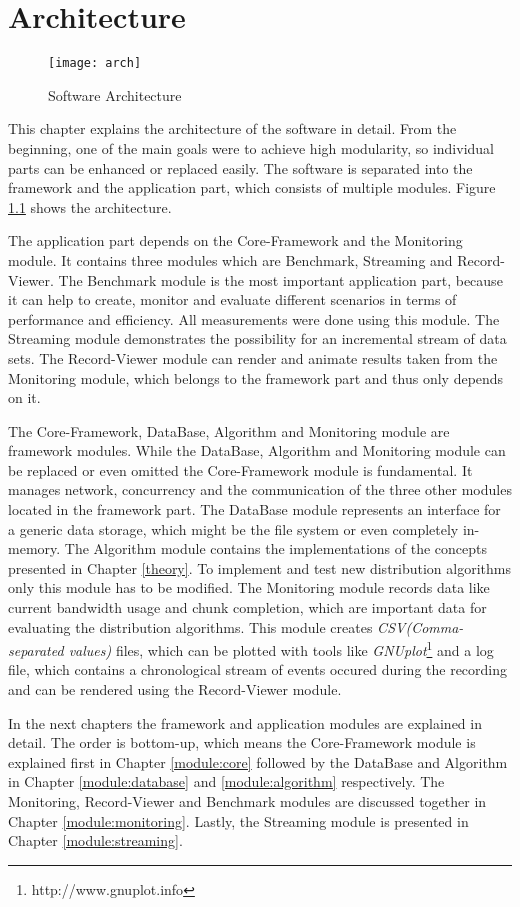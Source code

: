
\chapter{Architecture}
\label{architecture}

\begin{figure}[ht]
	\centering
	\texttt{[image: arch]}
	\caption{Software Architecture}
	\label{fig:arch}
\end{figure}

This chapter explains the architecture of the software in detail. From the beginning, one of the main goals were to achieve high modularity, so individual parts can be enhanced or replaced easily. The software is separated into the framework and the application part, which consists of multiple modules. Figure \ref{fig:arch} shows the architecture. 

\vfill
\pagebreak

The application part depends on the Core-Framework and the Monitoring module. It contains three modules which are Benchmark, Streaming and Record-Viewer. The Benchmark module is the most important application part, because it can help to create, monitor and evaluate different scenarios in terms of performance and efficiency. All measurements were done using this module. The Streaming module demonstrates the possibility for an incremental stream of data sets. The Record-Viewer module can render and animate results taken from the Monitoring module, which belongs to the framework part and thus only depends on it.

The Core-Framework, DataBase, Algorithm and Monitoring module are framework modules. While the DataBase, Algorithm and Monitoring module can be replaced or even omitted the Core-Framework module is fundamental. It manages network, concurrency and the communication of the three other modules located in the framework part. The DataBase module represents an interface for a generic data storage, which might be the file system or even completely in-memory. The Algorithm module contains the implementations of the concepts presented in Chapter \ref{theory}. To implement and test new distribution algorithms only this module has to be modified. The Monitoring module records data like current bandwidth usage and chunk completion, which are important data for evaluating the distribution algorithms. This module creates \emph{CSV(Comma-separated values)} files, which can be plotted with tools like \emph{GNUplot}\footnote{http://www.gnuplot.info} and a log file, which contains a chronological stream of events occured during the recording and can be rendered using the Record-Viewer module.

In the next chapters the framework and application modules are explained in detail. The order is bottom-up, which means the Core-Framework module is explained first in Chapter \ref{module:core} followed by the DataBase and Algorithm in Chapter \ref{module:database} and \ref{module:algorithm} respectively. The Monitoring, Record-Viewer and Benchmark modules are discussed together in Chapter \ref{module:monitoring}. Lastly, the Streaming module is presented in Chapter \ref{module:streaming}.